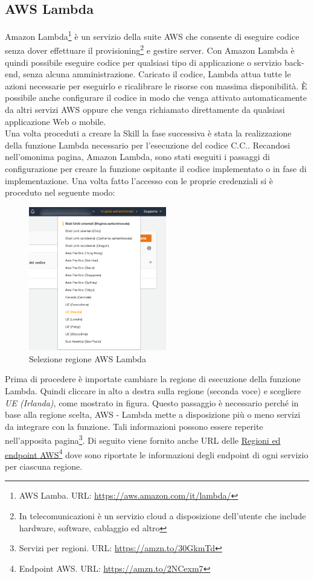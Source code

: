 \subsection{AWS Lambda}
Amazon Lambda\footnote{AWS Lamba. URL: \href{https://aws.amazon.com/it/lambda/}{https://aws.amazon.com/it/lambda/}} è un servizio della suite AWS che consente di eseguire codice senza dover effettuare il provisioning\footnote{In telecomunicazioni è un servizio cloud a disposizione dell'utente che include hardware, software, cablaggio ed altro} e gestire server. Con Amazon Lambda è quindi possibile eseguire codice per qualsiasi tipo di applicazione o servizio back-end, senza alcuna amministrazione. Caricato il codice, Lambda attua tutte le azioni necessarie per eseguirlo e ricalibrare le risorse con massima disponibilità. È possibile anche configurare il codice in modo che venga attivato automaticamente da altri servizi AWS oppure che venga richiamato direttamente da qualsiasi applicazione Web o mobile.\\[0.5cm]
Una volta proceduti a creare la Skill la fase successiva è stata la realizzazione della funzione Lambda necessario per l'esecuzione del codice C.C.. Recandosi nell'omonima pagina, Amazon Lambda, sono stati eseguiti i passaggi di configurazione per creare la funzione ospitante il codice implementato o in fase di implementazione. Una volta fatto l'accesso con le proprie credenziali si è proceduto nel seguente modo:
\begin{minipage}{0.5\textwidth}
	\begin{figure}[H]
		\includegraphics[width=6cm]{immagini/aws-lambda.png}
		\caption{\label{fig:aws_lambda_regione}Selezione regione AWS Lambda}
	\end{figure}
\end{minipage}
\begin{minipage}{0.5\textwidth}
	Prima di procedere è importate cambiare la regione di esecuzione della funzione Lambda. Quindi cliccare in alto a destra sulla regione (seconda voce) e scegliere \textit{UE (Irlanda)}, come mostrato in figura. Questo passaggio è necessario perché in base alla regione scelta, AWS - Lambda mette a disposizione più o meno servizi da integrare con la funzione. Tali informazioni possono essere reperite nell'apposita pagina\footnote{Servizi per regioni. URL: \href{https://amzn.to/30GkmTd}{https://amzn.to/30GkmTd}}. Di seguito viene fornito anche URL delle \href{https://amzn.to/2NCexm7}{Regioni ed endpoint AWS}\footnote{Endpoint AWS. URL: \href{https://amzn.to/2NCexm7}{https://amzn.to/2NCexm7}} dove sono riportate le informazioni degli endpoint di ogni servizio per ciascuna regione.
\end{minipage}
